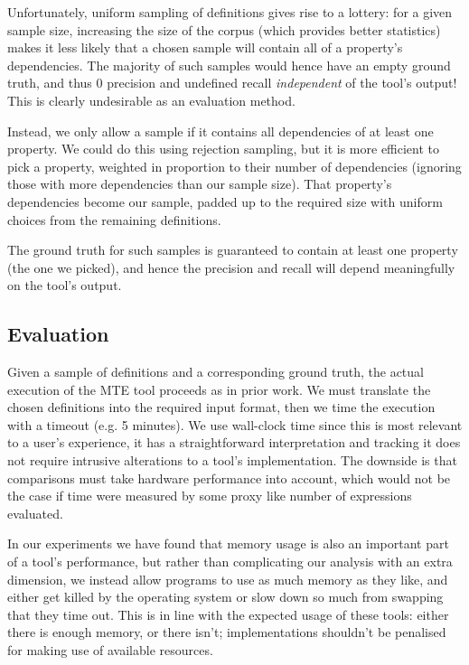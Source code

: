 Unfortunately, uniform sampling of definitions gives rise to a lottery: for a
given sample size, increasing the size of the corpus (which provides better
statistics) makes it less likely that a chosen sample will contain all of
a property's dependencies. The majority of such samples would hence have an empty
ground truth, and thus $0$ precision and undefined recall \emph{independent} of
the tool's output! This is clearly undesirable as an evaluation method.

Instead, we only allow a sample if it contains all dependencies of at least one
property. We could do this using rejection sampling, but it is more efficient to
pick a property, weighted in proportion to their number of dependencies
(ignoring those with more dependencies than our sample size). That property's
dependencies become our sample, padded up to the required size with uniform
choices from the remaining definitions.

The ground truth for such samples is guaranteed to contain at least one property
(the one we picked), and hence the precision and recall will depend meaningfully
on the tool's output.

\subsection{Evaluation}
\label{section:evaluation}

Given a sample of definitions and a corresponding ground truth, the actual
execution of the MTE tool proceeds as in prior work. We must translate the
chosen definitions into the required input format, then we time the execution
with a timeout (e.g. 5 minutes). We use wall-clock time since this is most
relevant to a user's experience, it has a straightforward interpretation and
tracking it does not require intrusive alterations to a tool's implementation.
The downside is that comparisons must take hardware performance into account,
which would not be the case if time were measured by some proxy like number of
expressions evaluated.

In our experiments we have found that memory usage is also an important part of
a tool's performance, but rather than complicating our analysis with an extra
dimension, we instead allow programs to use as much memory as they like, and
either get killed by the operating system or slow down so much from swapping
that they time out. This is in line with the expected usage of these tools:
either there is enough memory, or there isn't; implementations shouldn't be
penalised for making use of available resources.

